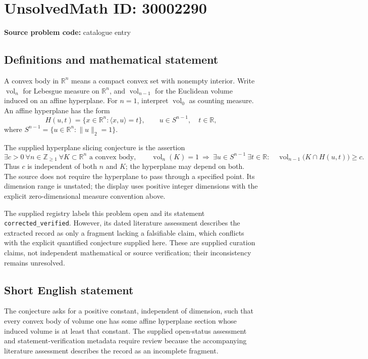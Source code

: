 \documentclass[11pt]{article}
\newcommand{\Z}{\mathbb{Z}}
\newcommand{\R}{\mathbb{R}}
\begin{document}
\section*{UnsolvedMath ID: 30002290}
\textbf{Source problem code:} catalogue entry
\subsection{Definitions and mathematical statement}
A convex body in \(\R^n\) means a compact convex set with nonempty interior. Write \(\operatorname{vol}_n\) for Lebesgue measure on \(\R^n\), and \(\operatorname{vol}_{n-1}\) for the Euclidean volume induced on an affine hyperplane. For \(n=1\), interpret \(\operatorname{vol}_0\) as counting measure. An affine hyperplane has the form
\[
H(u,t)=\{x\in\R^n:\langle x,u\rangle=t\},\qquad u\in S^{n-1},\quad t\in\R,
\]
where \(S^{n-1}=\{u\in\R^n:\|u\|_2=1\}\).

The supplied hyperplane slicing conjecture is the assertion
\[
\exists c>0\ \forall n\in\Z_{\geq 1}\ \forall K\subset\R^n\text{ a convex body},\qquad
\operatorname{vol}_n(K)=1
\ \Longrightarrow\ 
\exists u\in S^{n-1}\ \exists t\in\R:\quad
\operatorname{vol}_{n-1}\bigl(K\cap H(u,t)\bigr)\geq c.
\]
Thus \(c\) is independent of both \(n\) and \(K\); the hyperplane may depend on both. The source does not require the hyperplane to pass through a specified point. Its dimension range is unstated; the display uses positive integer dimensions with the explicit zero-dimensional measure convention above.

The supplied registry labels this problem open and its statement \texttt{corrected\_verified}. However, its dated literature assessment describes the extracted record as only a fragment lacking a falsifiable claim, which conflicts with the explicit quantified conjecture supplied here. These are supplied curation claims, not independent mathematical or source verification; their inconsistency remains unresolved.
\subsection{Short English statement}
The conjecture asks for a positive constant, independent of dimension, such that every convex body of volume one has some affine hyperplane section whose induced volume is at least that constant. The supplied open-status assessment and statement-verification metadata require review because the accompanying literature assessment describes the record as an incomplete fragment.
\end{document}
